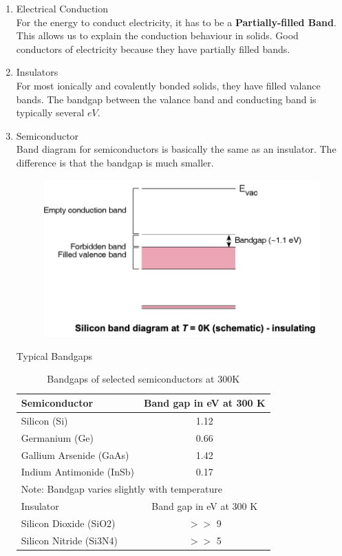 \begin{enumerate}
    \item Electrical Conduction \\
    For the energy to conduct electricity, it has to be a \textbf{Partially-filled Band}. \\
    This allows us to explain the conduction behaviour in solids. Good conductors of electricity because they have partially filled bands.
    \item Insulators \\
    For most ionically and covalently bonded solids, they have filled valance bands. The bandgap between the valance band and conducting band is typically several $eV$.
    \item Semiconductor \\
    Band diagram for semiconductors is basically the same as an insulator. The difference is that the bandgap is much smaller.
    \begin{figure}[h]
        \centering
        \includegraphics[width=0.75\linewidth]{image/semibandgap.png}
    \end{figure}
    Typical Bandgaps 
    \begin{table}[h!]
      \centering
      \caption{Bandgaps of selected semiconductors at 300K}
      \begin{tabular}{lc}
        \toprule
        Semiconductor & Band gap in eV at 300 K \\
        \midrule
        Silicon (Si) & 1.12 \\
        Germanium (Ge) & 0.66 \\
        Gallium Arsenide (GaAs) & 1.42 \\
        Indium Antimonide (InSb) & 0.17 \\
    
        \midrule
        \multicolumn{2}{l}{Note: Bandgap varies slightly with temperature} \\
        \midrule
        Insulator & Band gap in eV at 300 K \\
        \midrule
        Silicon Dioxide (SiO2) &  $>>$ 9 \\
        Silicon Nitride (Si3N4) &  $>>$ 5 \\
    

\end{tabular}
\end{table}
\end{enumerate}
